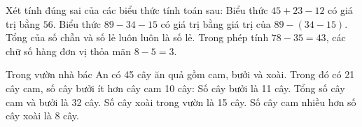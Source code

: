 \begin{ex} %
Xét tính đúng sai của các biểu thức tính toán sau:
\choiceTF
{\True Biểu thức $45 + 23 - 12$ có giá trị bằng $56$.}
{Biểu thức $89 - 34 - 15$ có giá trị bằng giá trị của $89 - (34 - 15)$.}
{\True Tổng của số chẵn và số lẻ luôn luôn là số lẻ.}
{\True Trong phép tính $78 - 35 = 43$, các chữ số hàng đơn vị thỏa mãn $8 - 5 = 3$.}
\end{ex}

\begin{ex} %
Trong vườn nhà bác An có 45 cây ăn quả gồm cam, bưởi và xoài. Trong đó có 21 cây cam, số cây bưởi ít hơn cây cam 10 cây:
\choiceTF
{\True Số cây bưởi là 11 cây.}
{\True Tổng số cây cam và bưởi là 32 cây.}
{Số cây xoài trong vườn là 15 cây.}
{\True Số cây cam nhiều hơn số cây xoài là 8 cây.}
\end{ex}

